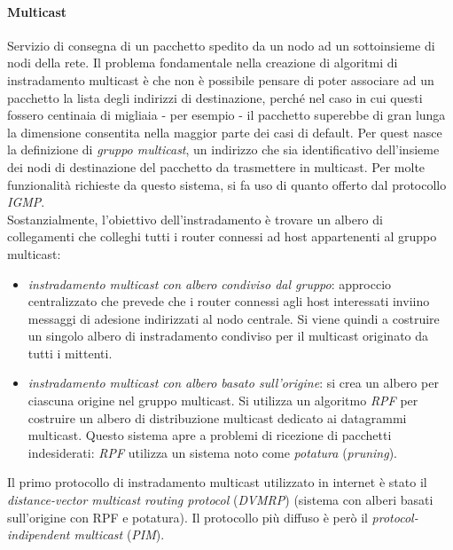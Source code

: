 \paragraph{Multicast}
Servizio di consegna di un pacchetto spedito da un nodo ad un sottoinsieme di nodi della rete.
Il problema fondamentale nella creazione di algoritmi di instradamento multicast è che non è possibile pensare di poter associare ad un pacchetto la lista degli indirizzi di destinazione, perché nel caso in cui questi fossero centinaia di migliaia - per esempio - il pacchetto superebbe di gran lunga la dimensione consentita nella maggior parte dei casi di default. Per quest nasce la definizione di \textit{gruppo multicast}, un indirizzo che sia identificativo dell'insieme dei nodi di destinazione del pacchetto da trasmettere in multicast. Per molte funzionalità richieste da questo sistema, si fa uso di quanto offerto dal protocollo \textit{IGMP}. \\
Sostanzialmente, l'obiettivo dell'instradamento è trovare un albero di collegamenti che colleghi tutti i router connessi ad host appartenenti al gruppo multicast:
\begin{itemize}
	\item \textit{instradamento multicast con albero condiviso dal gruppo}: approccio centralizzato che prevede che i router connessi agli host interessati inviino messaggi di adesione indirizzati al nodo centrale. Si viene quindi a costruire un singolo albero di instradamento condiviso per il multicast originato da tutti i mittenti.
	\item \textit{instradamento multicast con albero basato sull'origine}: si crea un albero per ciascuna origine nel gruppo multicast. Si utilizza un algoritmo \textit{RPF} per costruire un albero di distribuzione multicast dedicato ai datagrammi multicast. Questo sistema apre a problemi di ricezione di pacchetti indesiderati: \textit{RPF} utilizza un sistema noto come \textit{potatura} (\textit{pruning}).
\end{itemize}
Il primo protocollo di instradamento multicast utilizzato in internet è stato il \textit{distance-vector multicast routing protocol} (\textit{DVMRP}) (sistema con alberi basati sull'origine con RPF e potatura). Il protocollo più diffuso è però il \textit{protocol-indipendent multicast} (\textit{PIM}).